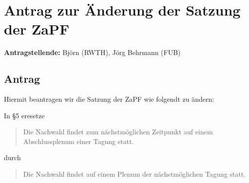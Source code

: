 \documentclass[draft,10pt,oneside]{scrartcl}
\begin{document}
\section*{Antrag zur Änderung der Satzung der ZaPF}

\textbf{Antragstellende:} Björn (RWTH), Jörg Behrmann (FUB)

\subsection*{Antrag}

Hiermit beantragen wir die Satzung der ZaPF wie folgendt zu ändern:

In §5 eresetze
\begin{quote}
    Die Nachwahl findet zum nächstmöglichen Zeitpunkt auf einem Abschlussplenum
    einer Tagung statt.
\end{quote}
durch
\begin{quote}
    Die Nachwahl findet auf einem Plenum der nächstmöglichen Tagung statt.
\end{quote}
\end{document}
